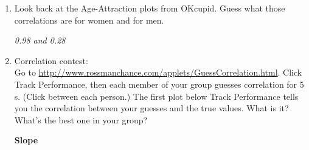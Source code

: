 \begin{enumerate}
\begin{key}
  {\it 0.56 - attractiveness and BAL, and 0.96 - petals}
\end{key}

  The first is data recreated from summary stats given for a study of
  how attractive men felt they were and their blood alcohol level (log
  scale, so negative numbers do make sense).
  The second shows measurements of iris petals. The clusters are for
  three different species. Within
  species correlations are quite different: 0.33, 0.79 and 0.32, but
  with all the data, correlation is higher. 

\item Look back at the Age-Attraction plots from OKcupid.
  Guess what those correlations are for women and for men.
\begin{students}
 \vspace{1cm}
\end{students}

\begin{key}
  {\it 0.98  and 0.28}
\end{key}

\item Correlation contest:\\
  Go to
  \url{http://www.rossmanchance.com/applets/GuessCorrelation.html}.
  Click \fbox{$\surd$} {\sf Track Performance}, then each member of your
  group guesses correlation for 5 s. (Click  between each person.)  The first plot
  below {\sf Track Performance} tells you the correlation between your
  guesses and the true values.  What  is it? What's the best one in
  your group? 
\begin{students} 
\vspace{1cm}
\end{students}



\begin{center}
  {\bf Slope}
\end{center}


\end{enumerate}
